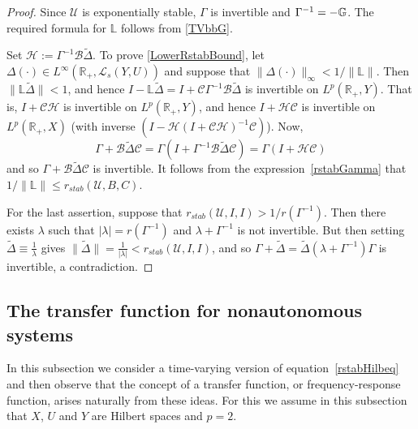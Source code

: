 \documentclass[10pt,psamsfonts,leqno]{siamltex}
\newcommand{\bbR}{\mathbb{R}}
\newcommand{\bbL}{\mathbb{L}}
\newcommand{\calB}{\mathcal{B}}
\newcommand{\calC}{\mathcal{C}}
\newcommand{\calH}{\mathcal{H}}
\newcommand{\LpRX}{{L^p(\bbR_+,X)}}
\newcommand{\LpRY}{{L^p(\bbR_+,Y)}}
\newcommand{\U}{\mathcal{U}}
\newcommand{\rstab}{r_{stab}}
\begin{document}
\begin{proof} Since $\U$ is exponentially stable,
$\Gamma$ is invertible and $\Gamma^{-1}=-\Bbb{G}$.
The required formula for $\bbL$ follows from \eqref{TVbbG}.

Set $\calH:=\Gamma^{-1}\calB\tilde{\Delta}$.  To prove
\eqref{LowerRstabBound},  let $\Delta(\cdot)\in
L^\infty(\bbR_+,\mathcal{L}_s(Y,U))$ and suppose that
$\|\Delta(\cdot)\|_\infty < 1/\|\bbL\|$.  Then
$\|\bbL\tilde{\Delta}\|<1$, and hence
$I-\bbL\tilde{\Delta}=I+\calC\Gamma^{-1}\calB\tilde{\Delta}$ is
invertible on $\LpRY$.  That is,
$I+\calC\calH$ is invertible on $\LpRY$, and hence
$I+\calH\calC$ is invertible on $\LpRX$ (with inverse
$(I-\calH(I+\calC\calH)^{-1}\calC)$).  Now,
\[
\Gamma+\calB\tilde{\Delta}\calC
=\Gamma(I+\Gamma^{-1}\calB\tilde{\Delta}\calC)
=\Gamma(I+\calH\calC)
\]
and so $\Gamma+\calB\tilde{\Delta}\calC$ is
invertible.  It follows from the expression~\eqref{rstabGamma}
that  $1/\|\bbL\|\le \rstab(\U,B,C)$.

For the last assertion, suppose that
$\rstab(\U,I,I)>1/r(\Gamma^{-1})$. Then there exists $\lambda$ such
that $|\lambda|=r(\Gamma^{-1})$ and
$\lambda+\Gamma^{-1}$ is not invertible.
But then setting $\tilde{\Delta}\equiv\frac{1}{\lambda}$ gives
$\|\tilde{\Delta}\|=\frac{1}{|\lambda|}<\rstab(\U,I,I)$, and so
$\Gamma+\tilde{\Delta}=\tilde{\Delta}(\lambda+\Gamma^{-1})\Gamma$ is
invertible, a contradiction.
\end{proof}

\subsection{The transfer function for nonautonomous systems} %

In this subsection  we consider a time-varying
version of equation~\eqref{rstabHilbeq} and then observe that
the concept of a transfer function, or frequency-response function,
arises naturally from these ideas.  For this we assume in this
subsection that $X$, $U$ and $Y$ are Hilbert spaces and $p=2$.
\end{document}
